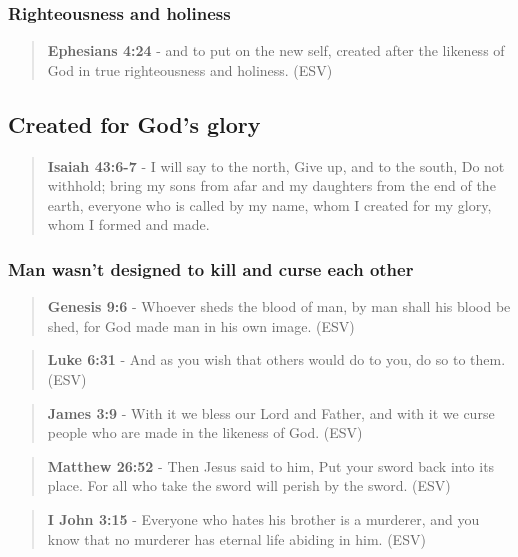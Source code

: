 \documentclass[11pt]{article}
\begin{document}
\subsubsection{Righteousness and holiness}
\label{sec:org884ea27}
\begin{quote}
\textbf{Ephesians 4:24} - and to put on the new self, created after the likeness of God in true righteousness and holiness. (ESV)
\end{quote}

\subsection{Created for God's glory}
\label{sec:org50c0038}
\begin{quote}
\textbf{Isaiah 43:6-7} - I will say to the north, Give up, and to the south, Do not withhold; bring my sons from afar and my daughters from the end of the earth, everyone who is called by my name, whom I created for my glory, whom I formed and made.
\end{quote}

\subsubsection{Man wasn't designed to kill and curse each other}
\label{sec:org7d53dc5}
\begin{quote}
\textbf{Genesis 9:6} - Whoever sheds the blood of man, by man shall his blood be shed, for God made man in his own image. (ESV)
\end{quote}

\begin{quote}
\textbf{Luke 6:31} - And as you wish that others would do to you, do so to them. (ESV)
\end{quote}

\begin{quote}
\textbf{James 3:9} - With it we bless our Lord and Father, and with it we curse people who are made in the likeness of God. (ESV)
\end{quote}

\begin{quote}
\textbf{Matthew 26:52} - Then Jesus said to him, Put your sword back into its place.  For all who take the sword will perish by the sword. (ESV)
\end{quote}

\begin{quote}
\textbf{I John 3:15} - Everyone who hates his brother is a murderer, and you know that no murderer has eternal life abiding in him. (ESV)
\end{quote}
\end{document}
